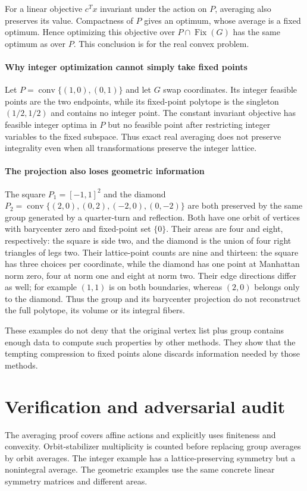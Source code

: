 \documentclass[11pt]{article}
\begin{document}
For a linear objective $c^Tx$ invariant under the action on $P$, averaging also preserves its value. Compactness of $P$ gives an optimum, whose average is a fixed optimum. Hence optimizing this objective over $P\cap\operatorname{Fix}(G)$ has the same optimum as over $P$. This conclusion is for the real convex problem.

\paragraph{Why integer optimization cannot simply take fixed points}
Let $P=\operatorname{conv}\{(1,0),(0,1)\}$ and let $G$ swap coordinates. Its integer feasible points are the two endpoints, while its fixed-point polytope is the singleton $(1/2,1/2)$ and contains no integer point. The constant invariant objective has feasible integer optima in $P$ but no feasible point after restricting integer variables to the fixed subspace. Thus exact real averaging does not preserve integrality even when all transformations preserve the integer lattice.

\paragraph{The projection also loses geometric information}
The square $P_1=[-1,1]^2$ and the diamond $P_2=\operatorname{conv}\{(2,0),(0,2),(-2,0),(0,-2)\}$ are both preserved by the same group generated by a quarter-turn and reflection. Both have one orbit of vertices with barycenter zero and fixed-point set $\{0\}$. Their areas are four and eight, respectively: the square is side two, and the diamond is the union of four right triangles of legs two. Their lattice-point counts are nine and thirteen: the square has three choices per coordinate, while the diamond has one point at Manhattan norm zero, four at norm one and eight at norm two. Their edge directions differ as well; for example $(1,1)$ is on both boundaries, whereas $(2,0)$ belongs only to the diamond. Thus the group and its barycenter projection do not reconstruct the full polytope, its volume or its integral fibers.

These examples do not deny that the original vertex list plus group contains enough data to compute such properties by other methods. They show that the tempting compression to fixed points alone discards information needed by those methods.

\section{Verification and adversarial audit}
The averaging proof covers affine actions and explicitly uses finiteness and convexity. Orbit-stabilizer multiplicity is counted before replacing group averages by orbit averages. The integer example has a lattice-preserving symmetry but a nonintegral average. The geometric examples use the same concrete linear symmetry matrices and different areas.
\end{document}
